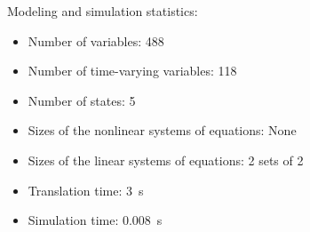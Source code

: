 \begin{contextbox}
  Modeling and simulation statistics:
  \begin{itemize}
    \item Number of variables: 488
    \item Number of time-varying variables: 118
    \item Number of states: 5
    \item Sizes of the nonlinear systems of equations: None
    \item Sizes of the linear systems of equations: 2 sets of 2
    \item Translation time: \SI{3}{s}
    \item Simulation time: \SI{0.008}{s}
  \end{itemize}
\end{contextbox}